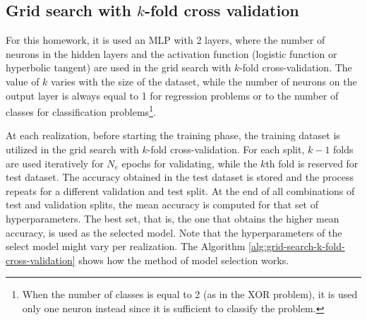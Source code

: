 \documentclass[12pt,a4paper]{article}
\begin{document}
\subsection{Grid search with \(k\)-fold cross validation}

For this homework, it is used an MLP with 2 layers, where the number of neurons in the hidden layers and the activation function (logistic function or hyperbolic tangent) are used in the grid search with \(k\)-fold cross-validation. The value of \(k\) varies with the size of the dataset, while the number of neurons on the output layer is always equal to 1 for regression problems or to the number of classes for classification problems\footnote{When the number of classes is equal to 2 (as in the XOR problem), it is used only one neuron instead since it is sufficient to classify the problem.}.

At each realization, before starting the training phase, the training dataset is utilized in the grid search with \(k\)-fold cross-validation. For each split, \(k-1\) folds are used iteratively for \(N_e\) epochs for validating, while the \(k\)th fold is reserved for test dataset. The accuracy obtained in the test dataset is stored and the process repeats for a different validation and test split. At the end of all combinations of test and validation splits, the mean accuracy is computed for that set of hyperparameters. The best set, that is, the one that obtains the higher mean accuracy, is used as the selected model. Note that the hyperparameters of the select model might vary per realization. The Algorithm \ref{alg:grid-search-k-fold-cross-validation} shows how the method of model selection works.
\end{document}
